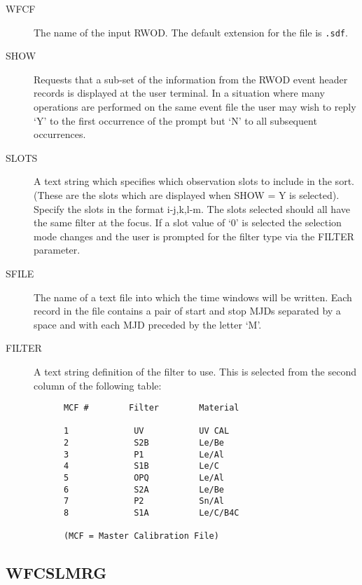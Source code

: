 \begin{description}

\item[WFCF]
The name of the input RWOD.  The default extension for the file is {\tt .sdf}.

\item[SHOW]
Requests that a sub-set of the information from the RWOD event header records
is displayed at the user terminal. In a situation where many
operations are performed on the same event file the user may wish to
reply `Y' to the first occurrence of the prompt but `N' to all subsequent
occurrences.

\item[SLOTS]
A text string which specifies which observation slots to include in
the sort. (These are the slots which are displayed when SHOW = Y is selected).
Specify the slots in the format i-j,k,l-m. The slots selected
should all have the same filter at the focus. If a slot value of `0' is
selected the selection mode changes and the user is prompted for the
filter type via the FILTER parameter.

\item[SFILE]
The name of a text file into which the time windows will be written.
Each record in the file contains a pair of start and stop MJDs
separated by a space and with each MJD preceded by the letter `M'.

\item[FILTER]
A text string definition of the filter to use. This is selected from
the second column of the following table:

\begin{verbatim}
      MCF #        Filter        Material

      1             UV           UV CAL
      2             S2B          Le/Be
      3             P1           Le/Al
      4             S1B          Le/C
      5             OPQ          Le/Al
      6             S2A          Le/Be
      7             P2           Sn/Al
      8             S1A          Le/C/B4C

      (MCF = Master Calibration File)
\end{verbatim}

\end{description}

\subsection{WFCSLMRG}
\label{sec:programs:wfcslmrg}

